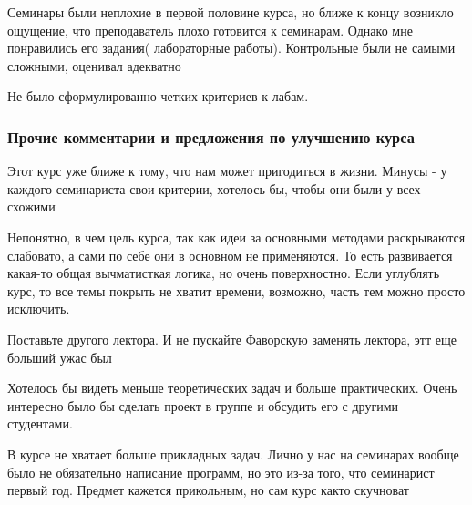             \begin{commentbox} 
                Семинары были неплохие в первой половине курса, но ближе к концу возникло ощущение, что преподаватель плохо готовится к семинарам. Однако мне понравились его задания( лабораторные работы). Контрольные были не самыми сложными, оценивал адекватно 
            \end{commentbox} 
        
            \begin{commentbox} 
                Не было сформулированно четких критериев к лабам.  
            \end{commentbox} 
    
    \subsubsection{Прочие комментарии и предложения по улучшению курса}
        \begin{commentbox}
            Этот курс уже ближе к тому, что нам может пригодиться в жизни. Минусы - у каждого семинариста свои критерии, хотелось бы, чтобы они были у всех схожими
        \end{commentbox}

        \begin{commentbox}
            Непонятно, в чем цель курса, так как идеи за основными методами раскрываются слабовато, а сами по себе они в основном не применяются. То есть развивается какая-то общая вычматисткая логика, но очень поверхностно. Если углублять курс, то все темы покрыть не хватит времени, возможно, часть тем можно просто исключить.
        \end{commentbox}

        \begin{commentbox}
            Поставьте другого лектора. И не пускайте Фаворскую заменять лектора, этт еще больший ужас был
        \end{commentbox}

        \begin{commentbox}
            Хотелось бы видеть меньше теоретических задач и больше практических. Очень интересно было бы сделать проект в группе и обсудить его с другими студентами.
        \end{commentbox}

        \begin{commentbox}
            В курсе не хватает больше прикладных задач. Лично у нас на семинарах вообще было не обязательно написание программ, но это из-за того, что семинарист первый год. Предмет кажется прикольным, но сам курс както скучноват
        \end{commentbox}

